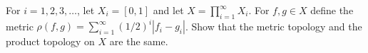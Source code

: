 For $i=1,2,3,\ldots $, let $X_i=[0,1]$ and let
$X=\prod_{i=1}^{\infty}X_i$. For $f,g\in X$ define the metric
$\rho(f,g)=\sum_{i=1}^{\infty}(1/2)^i|f_i-g_i|$. Show that the metric
topology and the product topology on $X$ are the same.

